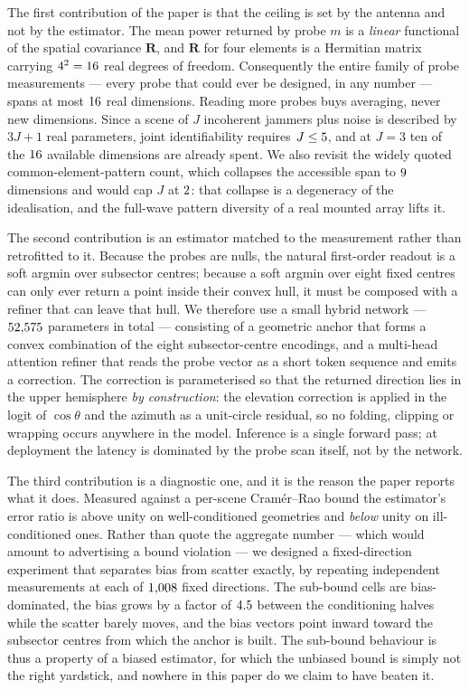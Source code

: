\documentclass[journal]{IEEEtran}
\newcommand{\Rt}{\mathbf{R}}
\begin{document}
The first contribution of the paper is that the ceiling is set by the antenna
and not by the estimator. The mean power returned by probe $m$ is a
\emph{linear} functional of the spatial covariance $\Rt$, and $\Rt$ for four
elements is a Hermitian matrix carrying $4^2 = 16$ real degrees of freedom.
Consequently the entire family of probe measurements --- every probe that could
ever be designed, in any number --- spans at most $16$ real dimensions. Reading
more probes buys averaging, never new dimensions. Since a scene of $J$
incoherent jammers plus noise is described by $3J + 1$ real parameters, joint
identifiability requires $J \le 5$, and at $J = 3$ ten of the $16$ available
dimensions are already spent. We also revisit the widely quoted
common-element-pattern count, which collapses the accessible span to $9$
dimensions and would cap $J$ at $2$: that collapse is a degeneracy of the
idealisation, and the full-wave pattern diversity of a real mounted array
lifts it.

The second contribution is an estimator matched to the measurement rather than
retrofitted to it. Because the probes are nulls, the natural first-order
readout is a soft argmin over subsector centres; because a soft argmin over
eight fixed centres can only ever return a point inside their convex hull, it
must be composed with a refiner that can leave that hull. We therefore use a
small hybrid network --- $52{,}575$ parameters in total --- consisting of a
geometric anchor that forms a convex combination of the eight subsector-centre
encodings, and a multi-head attention refiner that reads the probe vector as a
short token sequence and emits a correction. The correction is parameterised so
that the returned direction lies in the upper hemisphere \emph{by
construction}: the elevation correction is applied in the logit of
$\cos\theta$ and the azimuth as a unit-circle residual, so no folding, clipping
or wrapping occurs anywhere in the model. Inference is a single forward pass;
at deployment the latency is dominated by the probe scan itself, not by the
network.

The third contribution is a diagnostic one, and it is the reason the paper
reports what it does. Measured against a per-scene Cram\'er--Rao bound the
estimator's error ratio is above unity on well-conditioned geometries and
\emph{below} unity on ill-conditioned ones. Rather than quote the aggregate
number --- which would amount to advertising a bound violation --- we designed a
fixed-direction experiment that separates bias from scatter exactly, by
repeating independent measurements at each of $1{,}008$ fixed directions. The
sub-bound cells are bias-dominated, the bias grows by a factor of $4.5$ between
the conditioning halves while the scatter barely moves, and the bias vectors
point inward toward the subsector centres from which the anchor is built. The
sub-bound behaviour is thus a property of a biased estimator, for which the
unbiased bound is simply not the right yardstick, and nowhere in this paper do
we claim to have beaten it.
\end{document}
